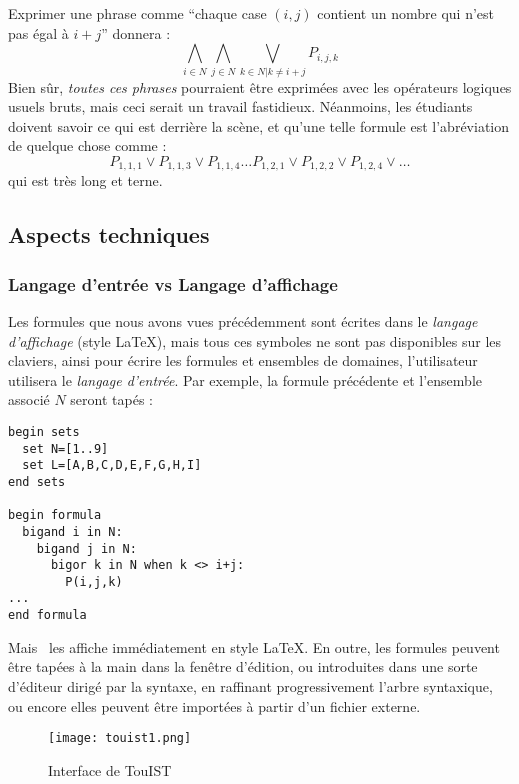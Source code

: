 Exprimer une phrase comme ``chaque case $(i,j)$ contient un nombre qui n'est pas \'egal \`a $i+j$'' donnera :
$$\bigwedge_{i \in N } \bigwedge_{j \in N} \bigvee_{k \in N|k\neq i+j} P_{i,j,k}$$
Bien s\^ur, \emph{toutes ces phrases} pourraient \^etre exprim\'ees avec les op\'erateurs logiques usuels bruts, mais ceci serait un travail fastidieux. N\'eanmoins, les \'etudiants doivent savoir ce qui est derri\`ere la sc\`ene, et qu'une telle formule est l'abr\'eviation de quelque chose comme :
$$P_{1,1,1}\vee P_{1,1,3}\vee P_{1,1,4}\ldots P_{1,2,1}\vee P_{1,2,2}\vee P_{1,2,4}\vee \ldots $$
qui est tr\`es long et terne.



\subsection{Aspects techniques}

\subsubsection*{Langage d'entr\'ee vs Langage d'affichage}

Les formules que nous avons vues pr\'ec\'edemment sont \'ecrites dans le \emph{langage d'affichage} (style \LaTeX), mais tous ces symboles ne sont pas disponibles sur les claviers, ainsi pour \'ecrire les formules et ensembles de domaines, l'utilisateur utilisera le \emph{langage d'entr\'ee}.
Par exemple, la formule pr\'ec\'edente et l'ensemble associ\'e $N$ seront tap\'es :
\begin{verbatim}
begin sets
  set N=[1..9]
  set L=[A,B,C,D,E,F,G,H,I]
end sets

begin formula
  bigand i in N:
    bigand j in N:
      bigor k in N when k <> i+j:
        P(i,j,k)
...
end formula
\end{verbatim}
Mais \nameTool\ les affiche imm\'ediatement en style \LaTeX. 
En outre, les formules peuvent \^etre tap\'ees \`a la main dans la fen\^etre d'\'edition, ou introduites dans une sorte d'\'editeur dirig\'e par la syntaxe, en raffinant progressivement l'arbre syntaxique, ou encore elles peuvent \^etre import\'ees \`a partir d'un fichier externe.




\begin{figure}[ht]
  \centering
  \texttt{[image: touist1.png]}
  \caption{Interface de TouIST}
  \label{fig:touist}
\end{figure}

